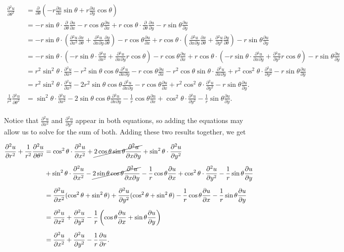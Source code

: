 \documentclass[11pt,oneside,english]{amsart}
\theoremstyle{definition}
\newcommand{\pp}[2]{\frac{\partial{#1}}{\partial{#2}}}
\begin{document}
\begin{enumerate}
\begin{align*}
\pp{^2u}{\theta^2}&=\pp{}{\theta}\left(-r\pp{u}{x}\sin\theta+r\pp{u}{y}\cos\theta\right)\\[2mm]
&=-r\sin\theta\cdot\pp{}{\theta}\pp{u}{x}-r\cos\theta\pp{u}{x}+r\cos\theta\cdot\pp{}{\theta}\pp{u}{y}-r\sin\theta\pp{u}{y}\\[2mm]
&=-r\sin\theta\cdot\left(\pp{^2u}{x^2}\pp{x}{\theta}+\pp{^2u}{x\partial y}\pp{y}{\theta}\right)-r\cos\theta\pp{u}{x}+r\cos\theta\cdot\left(\pp{^2u}{x\partial y}\pp{x}{\theta}+\pp{^2u}{y^2}\pp{y}{\theta}\right)-r\sin\theta\pp{u}{y}\\[2mm]
&=-r\sin\theta\cdot\left(-r\sin\theta\cdot\pp{^2u}{x^2}+\pp{^2u}{x\partial y}r\cos\theta\right)-r\cos\theta\pp{u}{x}+r\cos\theta\cdot\left(-r\sin\theta\cdot\pp{^2u}{x\partial y}+\pp{^2u}{y^2}r\cos\theta\right)-r\sin\theta\pp{u}{y}\\[2mm]
&=r^2\sin^2\theta\cdot\pp{^2u}{x^2}-r^2\sin\theta\cos\theta\pp{^2u}{x\partial y}-r\cos\theta\pp{u}{x}-r^2\cos\theta\sin\theta\cdot\pp{^2u}{x\partial y}+r^2\cos^2\theta\cdot\pp{^2u}{y^2}-r\sin\theta\pp{u}{y}\\[2mm]
&=r^2\sin^2\theta\cdot\pp{^2u}{x^2}-2r^2\sin\theta\cos\theta\pp{^2u}{x\partial y}-r\cos\theta\pp{u}{x}+r^2\cos^2\theta\cdot\pp{^2u}{y^2}-r\sin\theta\pp{u}{y}.\\[2mm]
\frac{1}{r^2}\pp{^2u}{\theta^2}&=\sin^2\theta\cdot\pp{^2u}{x^2}-2\sin\theta\cos\theta\pp{^2u}{x\partial y}-\frac{1}{r}\cos\theta\pp{u}{x}+\cos^2\theta\cdot\pp{^2u}{y^2}-\frac{1}{r}\sin\theta\pp{u}{y}.\\[2mm]
\end{align*}

Notice that $\pp{^2u}{x^2}$ and $\pp{^2u}{y^2}$ appear in both equations, so adding the equations may allow us to solve for the sum of both. Adding these two results together, we get

\begin{align*}
\pp{^2u}{r^2}+\frac{1}{r^2}\pp{^2u}{\theta^2}&=\cos^2\theta\cdot\pp{^2u}{x^2}+\cancel{2\cos\theta\sin\theta\pp{^2u}{x\partial y}}+\sin^2\theta\cdot\pp{^2u}{y^2}\\[2mm]
&+\sin^2\theta\cdot\pp{^2u}{x^2}-\cancel{2\sin\theta\cos\theta\pp{^2u}{x\partial y}}-\frac{1}{r}\cos\theta\pp{u}{x}+\cos^2\theta\cdot\pp{^2u}{y^2}-\frac{1}{r}\sin\theta\pp{u}{y}\\[2mm]
&=\pp{^2u}{x^2}(\cos^2\theta+\sin^2\theta)+\pp{^2u}{y^2}(\cos^2\theta+\sin^2\theta)-\frac{1}{r}\cos\theta\pp{u}{x}-\frac{1}{r}\sin\theta\pp{u}{y}\\[2mm]
&=\pp{^2u}{x^2}+\pp{^2u}{y^2}-\frac{1}{r}\left(\cos\theta\pp{u}{x}+\sin\theta\pp{u}{y}\right)\\[2mm]
&=\pp{^2u}{x^2}+\pp{^2u}{y^2}-\frac{1}{r}\pp{u}{r}.
\end{align*}


\end{enumerate}
\end{document}
